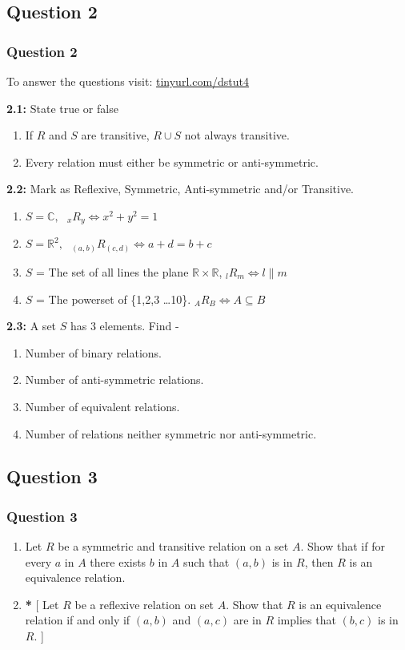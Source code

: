 \documentclass[xcolor=svgnames]{beamer}
\begin{document}
\subsection{Question 2}
\begin{frame}
\frametitle{Question 2}
To answer the questions visit:  \href{https://tinyurl.com/dstut4}{\underline{tinyurl.com/dstut4}}
\footnotesize{
\begin{multicols}{2}
\textbf{2.1:} State true or false
\begin{enumerate}
    \item If $R$ and $S$ are transitive, $R \cup S$ not always transitive. 
    \item Every relation must either be symmetric or anti-symmetric.
\end{enumerate}
\textbf{2.2:} Mark as Reflexive, Symmetric, Anti-symmetric and/or Transitive.
\begin{enumerate}
    \item $S = \mathbb{C},\text{ } _{x}R_{y} \iff x^2 + y^2 = 1$
    \item $S = \mathbb{R}^2,\text{ } _{(a,b)}R_{(c,d)} \iff a + d = b + c$
    \item $S$ = The set of all lines the plane $\mathbb{R} \times \mathbb{R}$, $_{l}R_{m} \iff l \parallel m$ 
    \item $S$ = The powerset of \{1,2,3 \ldots 10\}. $_{A}R_{B} \iff A \subseteq B$ 
\end{enumerate}
\textbf{2.3:} A set $S$ has $3$ elements. Find -  
\begin{enumerate}
    \item Number of binary relations.
    \item Number of anti-symmetric relations.
    \item Number of equivalent relations.
    \item Number of relations neither symmetric nor anti-symmetric.
\end{enumerate}
\end{multicols}
}
\end{frame}

\subsection{Question 3}
\begin{frame}
\frametitle{Question 3}
\begin{enumerate}
    \item Let $R$ be a symmetric and transitive relation on a set $A$. Show that if for every $a$ in $A$ there exists $b$ in $A$ such that $(a, b)$ is in $R$, then $R$ is an equivalence relation. 
    \item \textbf{*} [ Let $R$ be a reflexive relation on set $A$. Show that $R$ is an equivalence relation if and only if $(a, b)$ and $(a, c)$ are in $R$ implies that $(b,c)$ is in $R$. ]    
\end{enumerate}
\end{frame}
\end{document}
